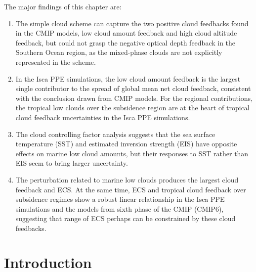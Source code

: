 The major findings of this chapter are:
\begin{enumerate}
    \item The simple cloud scheme can capture the two positive cloud feedbacks found in the CMIP models, low cloud amount feedback and high cloud altitude feedback, but could not grasp the negative optical depth feedback in the Southern Ocean region, as the mixed-phase clouds are not explicitly represented in the scheme.
    \item In the Isca PPE simulations, the low cloud amount feedback is the largest single contributor to the spread of global mean net cloud feedback, consistent with the conclusion drawn from CMIP models. For the regional contributions, the tropical low clouds over the subsidence region are at the heart of tropical cloud feedback uncertainties in the Isca PPE simulations.
    \item The cloud controlling factor analysis suggests that the sea surface temperature (SST) and estimated inversion strength (EIS) have opposite effects on marine low cloud amounts, but their responses to SST rather than EIS seem to bring larger uncertainty.
    \item The perturbation related to marine low clouds produces the largest cloud feedback and ECS. At the same time, ECS and tropical cloud feedback over subsidence regimes show a robust linear relationship in the Isca PPE simulations and the models from sixth phase of the CMIP (CMIP6), suggesting that range of ECS perhaps can be constrained by these cloud feedbacks.
\end{enumerate}

\section{Introduction}
\label{sec:cld_fbk_chap_intro}

